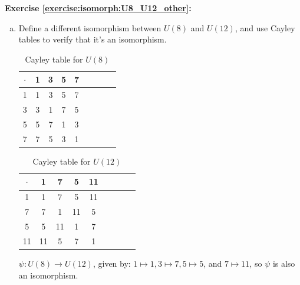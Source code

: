 \noindent\textbf{Exercise \ref{exercise:isomorph:U8_U12_other}:}
\begin{enumerate}[(a)]

\item
Define a different isomorphism between $U(8)$ and $U(12)$, and use Cayley tables to verify that it's an isomorphism. 
\begin{multicols}{2}
\begin{table}[H]
\caption{Cayley table for $U(8)$}
{\small
\begin{center}
\begin{tabular}{c|cccccccc}
$\cdot$ & 1 & 3 & 5 & 7  \\
\hline
1        & 1 & 3 & 5 & 7  \\
3       & 3 & 1 & 7 & 5  \\
5       & 5 & 7 & 1 & 3 \\
7       & 7 & 5 & 3 & 1 \\
\end{tabular}
\end{center}
}
\end{table}

\begin{table}[H]
\caption{Cayley table for $U(12)$}
{\small
\begin{center}
\begin{tabular}{c|cccccccc}
$\cdot$ & 1 & 7 & 5 & 11  \\
\hline
1        & 1 & 7 & 5 & 11  \\
7       & 7 & 1 & 11 & 5 \\
5       & 5 & 11 & 1 & 7  \\
11      & 11 & 5 & 7 & 1 \\
\end{tabular}
\end{center}
}
\end{table}
\end{multicols}
$\psi : U(8) \rightarrow U(12)$, given by: $1\mapsto 1, 3 \mapsto 7, 5 \mapsto 5$, and $7 \mapsto 11$, so $\psi$ is also an isomorphism.
\end{enumerate}

